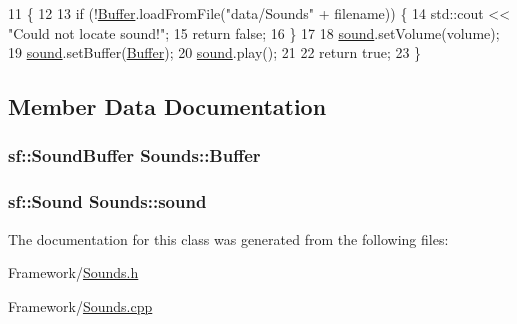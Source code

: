 \begin{DoxyCode}
11                                                             \{
12 
13     \textcolor{keywordflow}{if} (!\hyperlink{classSounds_adfef96a2fdcf9c4c19f3fd440dcddd4c}{Buffer}.loadFromFile(\textcolor{stringliteral}{"data/Sounds"} + filename)) \{
14         std::cout << \textcolor{stringliteral}{"Could not locate sound!"};
15         \textcolor{keywordflow}{return} \textcolor{keyword}{false};
16     \}
17 
18     \hyperlink{classSounds_a35f551bccc812d01040abf7ecf7b98a7}{sound}.setVolume(volume);
19     \hyperlink{classSounds_a35f551bccc812d01040abf7ecf7b98a7}{sound}.setBuffer(\hyperlink{classSounds_adfef96a2fdcf9c4c19f3fd440dcddd4c}{Buffer});
20     \hyperlink{classSounds_a35f551bccc812d01040abf7ecf7b98a7}{sound}.play();
21 
22     \textcolor{keywordflow}{return} \textcolor{keyword}{true};
23 \}
\end{DoxyCode}


\subsection{Member Data Documentation}
\subsubsection[{\texorpdfstring{Buffer}{Buffer}}]{\setlength{\rightskip}{0pt plus 5cm}sf\+::\+Sound\+Buffer Sounds\+::\+Buffer}\hypertarget{classSounds_adfef96a2fdcf9c4c19f3fd440dcddd4c}{}\label{classSounds_adfef96a2fdcf9c4c19f3fd440dcddd4c}
\subsubsection[{\texorpdfstring{sound}{sound}}]{\setlength{\rightskip}{0pt plus 5cm}sf\+::\+Sound Sounds\+::sound}\hypertarget{classSounds_a35f551bccc812d01040abf7ecf7b98a7}{}\label{classSounds_a35f551bccc812d01040abf7ecf7b98a7}


The documentation for this class was generated from the following files\+:\begin{DoxyCompactItemize}
\item 
Framework/\hyperlink{Sounds_8h}{Sounds.\+h}\item 
Framework/\hyperlink{Sounds_8cpp}{Sounds.\+cpp}\end{DoxyCompactItemize}
